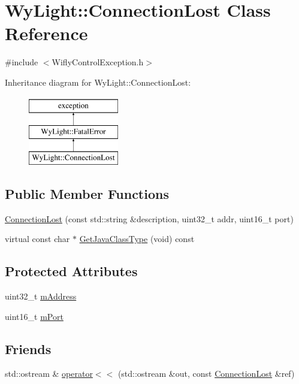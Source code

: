 \hypertarget{class_wy_light_1_1_connection_lost}{\section{Wy\-Light\-:\-:Connection\-Lost Class Reference}
\label{class_wy_light_1_1_connection_lost}
}


{\ttfamily \#include $<$Wifly\-Control\-Exception.\-h$>$}

Inheritance diagram for Wy\-Light\-:\-:Connection\-Lost\-:\begin{figure}[H]
\begin{center}
\leavevmode
\includegraphics[height=3.000000cm]{class_wy_light_1_1_connection_lost}
\end{center}
\end{figure}
\subsection*{Public Member Functions}
\begin{DoxyCompactItemize}
\item 
\hyperlink{class_wy_light_1_1_connection_lost_a73ee7baed28dc3b7dd34a045a618e259}{Connection\-Lost} (const std\-::string \&description, uint32\-\_\-t addr, uint16\-\_\-t port)
\item 
virtual const char $\ast$ \hyperlink{class_wy_light_1_1_connection_lost_a32dbb008e84c419fdb31b7b4b13b6f7f}{Get\-Java\-Class\-Type} (void) const 
\end{DoxyCompactItemize}
\subsection*{Protected Attributes}
\begin{DoxyCompactItemize}
\item 
uint32\-\_\-t \hyperlink{class_wy_light_1_1_connection_lost_ae4207146ab81928c6ae1a161602a8765}{m\-Address}
\item 
uint16\-\_\-t \hyperlink{class_wy_light_1_1_connection_lost_a54e8b7c58d8f24d8da4fd839aa8e556d}{m\-Port}
\end{DoxyCompactItemize}
\subsection*{Friends}
\begin{DoxyCompactItemize}
\item 
std\-::ostream \& \hyperlink{class_wy_light_1_1_connection_lost_a6a1446a3968cd20190989430f0f441c6}{operator$<$$<$} (std\-::ostream \&out, const \hyperlink{class_wy_light_1_1_connection_lost}{Connection\-Lost} \&ref)
\end{DoxyCompactItemize}



